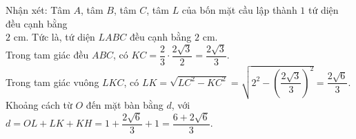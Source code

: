 \begin{ex}
{\begin{center}
		\end{center}
		Nhận xét: Tâm $A$, tâm $B$, tâm $C$, tâm $L$ của bốn mặt cầu lập thành $1$ tứ diện đều cạnh bằng\\
		$2$ cm. Tức là, tứ diện $LABC$ đều cạnh bằng $2$ cm.\\
		Trong tam giác đều $ABC$, có $KC=\dfrac{2}{3}\cdot\dfrac{2\sqrt{3}}{2}=\dfrac{2\sqrt{3}}{3}$.\\
		Trong tam giác vuông $LKC$, có $LK=\sqrt{LC^2-KC^2}=\sqrt{2^2-\left(\dfrac{2\sqrt{3}}{3}\right)^2}=\dfrac{2\sqrt{6}}{3}$.\\		Khoảng cách từ $O$ đến mặt bàn bằng $d$, với $d=OL+LK+KH=1+\dfrac{2\sqrt{6}}{3}+1=\dfrac{6+2\sqrt{6}}{3}$.}
\end{ex}
